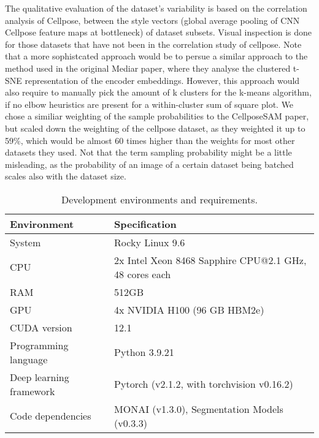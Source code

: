 The qualitative evaluation of the dataset's variability is based on the correlation analysis of Cellpose, between the style vectors (global average pooling of CNN Cellpose feature maps at bottleneck) of dataset subsets. Visual inspection is done for those datasets that have not been in the correlation study of cellpose. Note that a more sophistcated approach would be to persue a similar approach to the method used in the original Mediar paper, where they analyse the clustered t-SNE representation of the encoder embeddings. However, this approach would also require to manually pick the amount of k clusters for the k-means algorithm, if no elbow heuristics are present for a within-cluster sum of square plot. We chose a similiar weighting of the sample probabilities to the CellposeSAM paper, but scaled down the weighting of the cellpose dataset, as they weighted it up to 59\%, which would be almost 60 times higher than the weights for most other datasets they used. Not that the term sampling probability might be a little misleading, as the probability of an image of a certain dataset being batched scales also with the dataset size.

\begin{table}[ht]
\centering
\footnotesize
\caption{Development environments and requirements.}
\begin{tabular}{l l}
\hline\hline
\textbf{Environment} & \textbf{Specification} \\
\hline
System & Rocky Linux 9.6 \\
CPU & 2x Intel Xeon 8468 Sapphire CPU@2.1 GHz, 48 cores each \\
RAM & 512GB\\
GPU & 4x NVIDIA H100 (96 GB HBM2e) \\
CUDA version & 12.1 \\
Programming language & Python 3.9.21 \\
Deep learning framework & Pytorch (v2.1.2, with torchvision v0.16.2) \\
Code dependencies & MONAI (v1.3.0), Segmentation Models (v0.3.3) \\
\hline
\end{tabular}
\end{table}

